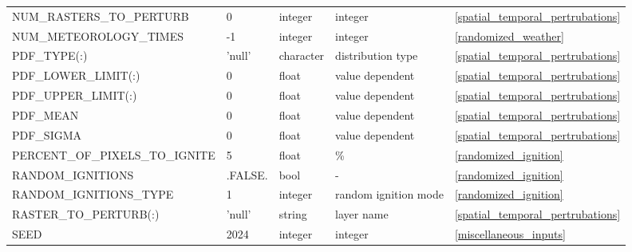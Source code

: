 \begin{landscape}
\begin{center}
\begin{longtable}{lllll}
NUM\_RASTERS\_TO\_PERTURB                    & 0                          & integer                & integer                            & \ref{spatial_temporal_pertrubations} \\
NUM\_METEOROLOGY\_TIMES                      & -1                         & integer                & integer                            & \ref{randomized_weather}             \\
PDF\_TYPE(:)                                 & 'null'                     & character              & distribution type                  & \ref{spatial_temporal_pertrubations} \\
PDF\_LOWER\_LIMIT(:)                         & 0                          & float                  & value dependent                    & \ref{spatial_temporal_pertrubations} \\
PDF\_UPPER\_LIMIT(:)                         & 0                          & float                  & value dependent                    & \ref{spatial_temporal_pertrubations} \\
PDF\_MEAN                                    & 0                          & float                  & value dependent                    & \ref{spatial_temporal_pertrubations} \\
PDF\_SIGMA                                   & 0                          & float                  & value dependent                    & \ref{spatial_temporal_pertrubations} \\
PERCENT\_OF\_PIXELS\_TO\_IGNITE              & 5                          & float                  & \%                                 & \ref{randomized_ignition}            \\
RANDOM\_IGNITIONS                            & .FALSE.                    & bool                   & -                                  & \ref{randomized_ignition}            \\
RANDOM\_IGNITIONS\_TYPE                      & 1                          & integer                & random ignition mode               & \ref{randomized_ignition}            \\
RASTER\_TO\_PERTURB(:)                       & 'null'                     & string                 & layer name                         & \ref{spatial_temporal_pertrubations} \\
SEED                                         & 2024                       & integer                & integer                            & \ref{miscellaneous_inputs}           \\

\end{longtable}
\end{center}
\end{landscape}
